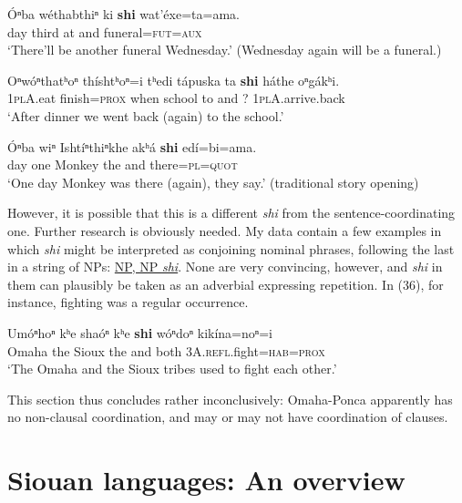 \documentclass[output=paper]{LSP/langsci}
\begin{document}
\begin{exe}	
\ex
\gll \'Oⁿba 	w\'ethabthiⁿ 	ki 	\textbf{shi}  	wat'\'exe=ta=ama.  \\
day  	third          	at 	and 	funeral=\textsc{fut=aux}  \\
\trans `There'll be another funeral Wednesday.'   (Wednesday again will be a funeral.)

\ex 
\gll Oⁿw\'oⁿthatʰoⁿ th\'ishtʰoⁿ=i 	tʰedi 	t\'apuska 	ta 	\textbf{shi}  h\'athe 	oⁿg\'akʰi. \\
\textsc{1plA}.eat  	finish=\textsc{prox} 	when 	school 	to 	and ?  	\textsc{1plA}.arrive.back \\
\trans `After dinner we went back (again) to the school.'

\ex
\gll \'Oⁿba 	wiⁿ 	Isht\'iⁿthiⁿkhe 	akʰ\'a \textbf{shi} ed\'i=bi=ama. \\
day	one 	Monkey 	the 	and 	there=\textsc{pl=quot} \\
\trans `One day Monkey was there (again), they say.'  (traditional story opening)
\end{exe}

However, it is possible that this is a different \textit{shi} from the sentence-coordinating one. Further research is obviously needed. My data contain a few examples in which \textit{shi} might be interpreted as conjoining nominal phrases, following the last in a string of NPs:  \underline{NP, NP \textit{shi}}. None are very convincing, however, and \textit{shi} in them can plausibly be taken as an adverbial expressing repetition. In (36), for instance, fighting was a regular occurrence.

\begin{exe}
\ex
\gll Um\'oⁿhoⁿ kʰe sha\'oⁿ kʰe \textbf{shi}  w\'oⁿdoⁿ 	kik\'ina=noⁿ=i \\
Omaha    	the 	Sioux  	the 	and both \textsc{3A}.\textsc{refl}.fight=\textsc{hab}=\textsc{prox} \\
\trans `The Omaha and the Sioux tribes used to fight each other.'    
\end{exe}

This section thus concludes rather inconclusively: Omaha-Ponca apparently has no non-clausal coordination, and may or may not have coordination of clauses. 

\section{Siouan languages: An overview}
\end{document}
